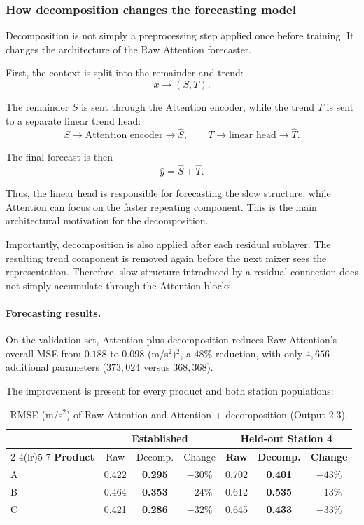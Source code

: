 \documentclass[a4, 12pt]{article}
\begin{document}
\subsubsection{How decomposition changes the forecasting model}

Decomposition is not simply a preprocessing step applied once before
training. It changes the architecture of the Raw Attention forecaster.

First, the context is split into the remainder and trend:
\[
x \rightarrow (S,T).
\]

The remainder $S$ is sent through the Attention encoder, while the trend
$T$ is sent to a separate linear trend head:
\[
S \rightarrow \text{Attention encoder} \rightarrow \hat{S},
\qquad
T \rightarrow \text{linear head} \rightarrow \hat{T}.
\]

The final forecast is then
\[
\hat{y}=\hat{S}+\hat{T}.
\]

Thus, the linear head is responsible for forecasting the slow structure,
while Attention can focus on the faster repeating component. This is the
main architectural motivation for the decomposition.

Importantly, decomposition is also applied after each residual sublayer.
The resulting trend component is removed again before the next mixer sees
the representation. Therefore, slow structure introduced by a residual
connection does not simply accumulate through the Attention blocks.

\paragraph{Forecasting results.}

On the validation set, Attention plus decomposition reduces Raw
Attention's overall MSE from $0.188$ to $0.098$ (m/s$^2$)$^2$, a
$48\%$ reduction, with only $4{,}656$ additional parameters
($373{,}024$ versus $368{,}368$).

The improvement is present for every product and both station populations:

\begin{table}[htbp]
\centering
\caption{RMSE (m/s$^2$) of Raw Attention and Attention + decomposition
(Output 2.3).}
\label{tab:decomp_ablation}
\vspace{2mm}
\begin{tabular}{@{} l ccc ccc @{}}
\toprule
& \multicolumn{3}{c}{\textbf{Established}} &
  \multicolumn{3}{c}{\textbf{Held-out Station 4}} \\
\cmidrule(lr){2-4}\cmidrule(lr){5-7}
\textbf{Product} & Raw & Decomp. & Change &
\textbf{Raw} & \textbf{Decomp.} & \textbf{Change} \\
\midrule
A & 0.422 & \textbf{0.295} & $-30\%$
  & 0.702 & \textbf{0.401} & $-43\%$ \\
B & 0.464 & \textbf{0.353} & $-24\%$
  & 0.612 & \textbf{0.535} & $-13\%$ \\
C & 0.421 & \textbf{0.286} & $-32\%$
  & 0.645 & \textbf{0.433} & $-33\%$ \\
\bottomrule
\end{tabular}
\end{table}
\end{document}
